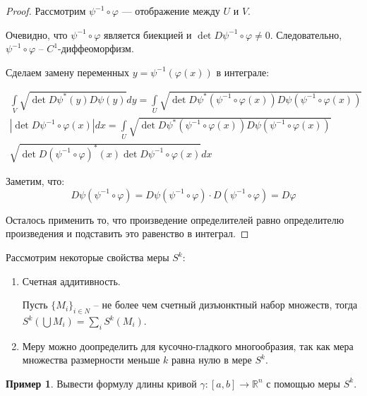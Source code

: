\documentclass[a5paper]{article}
\newcounter{through}
\theoremstyle{plain}
\theoremstyle{definition}
\newtheorem{example}[through]{Пример}
\numberwithin{through}{section}
\numberwithin{equation}{section}
\begin{document}
\begin{proof}
	Рассмотрим $\psi^{-1} \circ \varphi$ --- отображение между $U$ и $V$.
	
	Очевидно, что $\psi^{-1} \circ \varphi$ является биекцией и $\det D \psi^{-1} \circ \varphi \not= 0$. Следовательно, $\psi^{-1} \circ \varphi$ -- $C^1$-диффеоморфизм.
	
	Сделаем замену переменных $y = \psi^{-1} (\varphi (x))$ в интеграле:
	
	\begin{multline*}
		\int\limits_{V} \sqrt{\det D \psi^* (y) D \psi (y)} dy = 
		\int\limits_{U} \sqrt{\det D \psi^* (\psi^{-1} \circ \varphi (x)) D \psi (\psi^{-1} \circ \varphi (x)) } \\ 
		|\det D \psi^{-1} \circ \varphi (x)|dx = \int\limits_{U} \sqrt{\det D \psi^* (\psi^{-1} \circ \varphi (x)) D \psi (\psi^{-1} \circ \varphi (x)) } \\ \sqrt{\det D (\psi^{-1} \circ \varphi)^* (x) \det D \psi^{-1} \circ \varphi (x)} dx
	\end{multline*}
	
	Заметим, что: 
	\begin{equation*}
		D \psi(\psi^{-1} \circ \varphi) = D \psi (\psi^{-1} \circ \varphi) \cdot D (\psi^{-1} \circ \varphi) = D \varphi
	\end{equation*}
	
	
	Осталось применить то, что произведение определителей равно определителю произведения и подставить это равенство в интеграл.
\end{proof}

Рассмотрим некоторые свойства меры $S^k$:

\begin{enumerate}
	\item Счетная аддитивность. 
	
	Пусть $\{M_i\}_{i \in N}$ -- не более чем счетный дизъюнктный набор множеств, тогда $S^k(\bigcup M_i) = \sum\limits_{i} S^k(M_i)$.
	
	\item Меру можно доопределить для кусочно-гладкого многообразия, так как мера множества размерности меньше $k$ равна нулю в мере $S^k$.
\end{enumerate}

\begin{example}
	Вывести формулу длины кривой $\gamma : [a, b] \to \mathbb{R}^n$ с помощью меры $S^k$.
\end{example}
\end{document}
